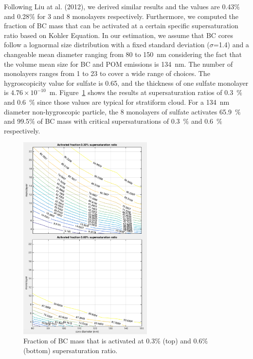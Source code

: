 \documentclass[12pt]{article}
\begin{document}
	Following Liu at al. (2012), we derived similar results and the values are 0.43$\%$ and 0.28$\%$ for 3 and 8 monolayers respectively. Furthermore, we computed the fraction of BC mass that can be activated at a certain specific supersaturation ratio based on Kohler Equation. In our estimation, we assume that BC cores follow a lognormal size distribution with a fixed standard deviation ($\sigma$=1.4) and a changeable mean diameter ranging from 80 to 150~nm considering the fact that the volume mean size for BC and POM emissions is 134~nm. The number of monolayers ranges from 1 to 23 to cover a wide range of choices. The hygroscopicity value for sulfate is 0.65, and the thickness of one sulfate monolayer is $4.76 \times 10^{-10}$~m. Figure~\ref{fig_P10} shows the results at supersaturation ratios of 0.3~$\%$ and 0.6~$\%$ since those values are typical for stratiform cloud. For a 134~nm diameter non-hygroscopic particle, the 8 monolayers of sulfate activates 65.9~$\%$ and 99.5$\%$ of BC mass with critical supersaturations of 0.3~$\%$ and 0.6~$\%$ respectively.  
	
	\begin{figure}[H] 
		\begin{center}
			\includegraphics[width = 0.6\textwidth]{Figure10}
			\caption[]{\label{fig_P10} Fraction of BC mass that is activated at 0.3$\%$ (top) and 0.6$\%$ (bottom) supersaturation ratio.}
		\end{center}
	\end{figure}
\end{document}
